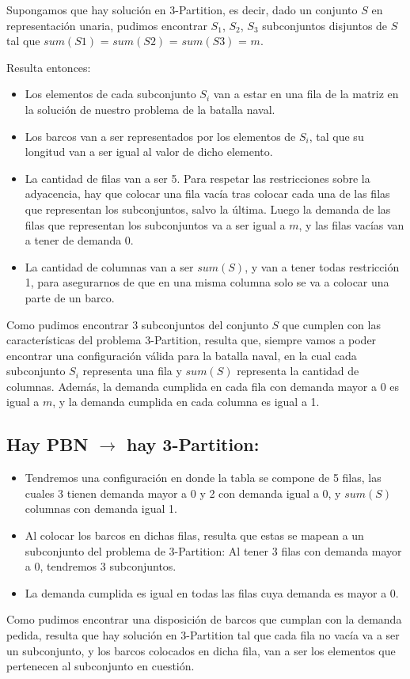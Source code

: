 Supongamos que hay solución en 3-Partition, es decir, dado un conjunto $S$ en representación unaria, pudimos
encontrar $S_1$, $S_2$, $S_3$ subconjuntos disjuntos de $S$ tal que $sum(S1)$ = $sum(S2)$ = $sum(S3)$ = $m$.

Resulta entonces: 

\begin{itemize}
    \item Los elementos de cada subconjunto $S_i$ van a estar en una fila de la matriz en la solución de nuestro problema de la batalla naval.
    \item Los barcos van a ser representados por los elementos de $S_i$, tal que su longitud van a ser igual al valor de dicho elemento.
    \item La cantidad de filas van a ser 5. Para respetar las restricciones sobre la adyacencia, hay que colocar una fila vacía tras colocar cada una de las filas que representan los subconjuntos, salvo la última. Luego la demanda de las filas que representan los subconjuntos va a ser igual a $m$, y las filas vacías van a tener de demanda 0.
    \item La cantidad de columnas van a ser $sum(S)$, y van a tener todas restricción 1, para asegurarnos de que en una misma columna solo se va a colocar una parte de un barco.
\end{itemize}
Como pudimos encontrar 3 subconjuntos del conjunto $S$ que cumplen con las características del problema 3-Partition, resulta que, siempre vamos a poder encontrar una configuración válida para la batalla naval, en la cual cada subconjunto $S_i$ representa una fila y $sum(S)$ representa la cantidad de columnas. Además, la demanda cumplida en cada fila con demanda mayor a 0 es igual a $m$, y la demanda cumplida en cada columna es igual a 1.
    
\subsection{Hay PBN $\rightarrow$ hay 3-Partition:}

\begin{itemize}
    \item Tendremos una configuración en donde la tabla se compone de 5 filas, las cuales 3 tienen demanda mayor a 0 y 2 con demanda igual a 0, y $sum(S)$ columnas con demanda igual 1.
    \item Al colocar los barcos en dichas filas, resulta que estas se mapean a un subconjunto del problema de 3-Partition: Al tener 3 filas con demanda mayor a 0, tendremos 3 subconjuntos.
    \item La demanda cumplida es igual en todas las filas cuya demanda es mayor a 0.
\end{itemize}
Como pudimos encontrar una disposición de barcos que cumplan con la demanda pedida, resulta que hay solución en 3-Partition tal que cada fila no vacía va a ser un subconjunto, y los barcos colocados en dicha fila, van a ser los elementos que pertenecen al subconjunto en cuestión.

